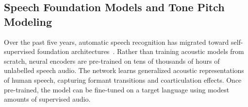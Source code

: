 \documentclass[conference]{IEEEtran}
\begin{document}
\subsection{Speech Foundation Models and Tone Pitch Modeling}
\label{sec:sota:asr}

Over the past five years, automatic speech recognition has migrated toward self-supervised foundation architectures~\cite{conneau2023fleurs, radford2023robust}. Rather than training acoustic models from scratch, neural encoders are pre-trained on tens of thousands of hours of unlabelled speech audio. The network learns generalized acoustic representations of human speech, capturing formant transitions and coarticulation effects. Once pre-trained, the model can be fine-tuned on a target language using modest amounts of supervised audio.
\end{document}
